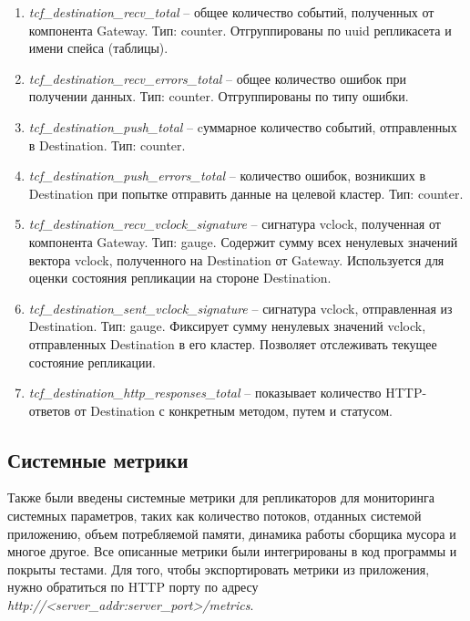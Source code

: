 \begin{enumerate}[label=\arabic*.]
  \item \textit{tcf\_destination\_recv\_total} -- общее количество событий, полученных от компонента Gateway. Тип: counter. Отгруппированы по uuid репликасета и имени спейса (таблицы).
  \item \textit{tcf\_destination\_recv\_errors\_total} -- общее количество ошибок при получении данных. Тип: counter. Отгруппированы по типу ошибки.
  \item \textit{tcf\_destination\_push\_total} -- cуммарное количество событий, отправленных в
  Destination. Тип: counter.
  \item \textit{tcf\_destination\_push\_errors\_total} -- количество ошибок, возникших в Destination
  при попытке отправить данные на целевой кластер. Тип: counter.
  \item \textit{tcf\_destination\_recv\_vclock\_signature} -- сигнатура vclock, полученная от
  компонента Gateway. Тип: gauge. Содержит сумму всех ненулевых значений вектора vclock, полученного
  на Destination от Gateway. Используется для оценки состояния репликации на стороне Destination.
  \item \textit{tcf\_destination\_sent\_vclock\_signature} -- сигнатура vclock, отправленная из
  Destination. Тип: gauge. Фиксирует сумму ненулевых значений vclock, отправленных Destination в его
  кластер. Позволяет отслеживать текущее состояние репликации.
  \item \textit{tcf\_destination\_http\_responses\_total} -- показывает количество HTTP-ответов от
  Destination с конкретным методом, путем и статусом.
\end{enumerate}

\subsection{Системные метрики}

Также были введены системные метрики для репликаторов для мониторинга системных параметров, таких как
количество потоков, отданных системой приложению, объем потребляемой памяти, динамика работы сборщика
мусора и многое другое. Все описанные метрики были интегрированы в код программы и покрыты тестами. Для
того, чтобы экспортировать метрики из приложения, нужно обратиться по HTTP порту по адресу
\textit{http://<server\_addr:server\_port>/metrics}.
